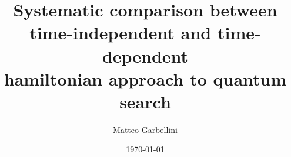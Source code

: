 \documentclass[aps,pra,reprint, onecolumn, showkeys]{revtex4-2}
\begin{document}
\title{Systematic comparison between time-independent and time-dependent \\ hamiltonian approach to quantum search}


\author{Matteo Garbellini}


\date{\today}



\maketitle
\end{document}
